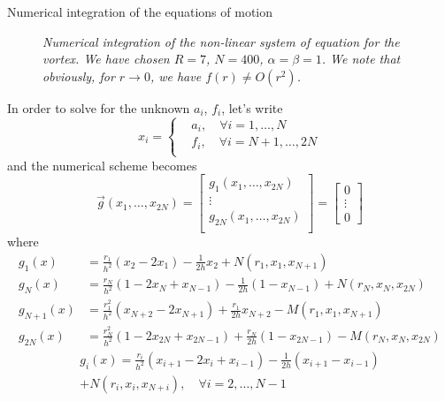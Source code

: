 \begin{subsection}{Numerical integration of the equations of motion}
  \begin{figure}[h!]
    
    \caption{\em Numerical integration of the non-linear system of
      equation for the vortex. We have chosen $R = 7$, $N = 400$,
      $\alpha = \beta = 1$. We note that obviously, for $r\to 0$, we
      have $f(r)\neq O(r^2)$.}
    \label{fig:a_and_f_funcs}
  \end{figure}

  In order to solve for the unknown $a_i$, $f_i$, let's write
  \begin{equation}
    x_i =\left\{
    \begin{aligned}
      &a_i,\quad\forall i = 1,\dots,N\\
      &f_i,\quad\forall i = N+1,\dots,2N\\
    \end{aligned}\right.
  \end{equation}
  and the numerical scheme becomes
  \begin{equation}
    \vec g(x_1,\dots,x_{2N}) =
    \begin{bmatrix}
      g_1(x_1, \dots, x_{2N})\\
      \vdots\\
      g_{2N}(x_1, \dots, x_{2N})\\
    \end{bmatrix}
    =
    \begin{bmatrix}
      0\\
      \vdots\\
      0
    \end{bmatrix}
  \end{equation}
  where
  \begin{align}
    g_1(x) &= \frac{r_1}{h^2}\left(x_2-2x_1\right)-\frac{1}{2h}x_2+N(r_1,x_1,x_{N+1})\\
    g_N(x) &= \frac{r_N}{h^2}\left(1-2x_N+x_{N-1}\right)-\frac{1}{2h}\left(1-x_{N-1}\right)+N(r_N,x_N,x_{2N})\\
    g_{N+1}(x)& = \frac{r_1^2}{h^2}\left(x_{N+2}-2x_{N+1}\right)+\frac{r_1}{2h}x_{N+2}-M(r_1,x_1, x_{N+1})\\
    g_{2N}(x) &= \frac{r_N^2}{h^2}\left(1-2x_{2N}+x_{2N-1}\right)+\frac{r_N}{2h}\left(1-x_{2N-1}\right)-M(r_N,x_N, x_{2N})
  \end{align}
  \begin{multline}
    g_i(x) = \frac{r_i}{h^2}\left(x_{i+1}-2x_i+x_{i-1}\right)-\frac{1}{2h}\left(x_{i+1}-x_{i-1}\right)\\
    +N(r_i, x_i, x_{N+i}),\quad
    \forall i = 2,\dots,N-1\\

\end{multline}
\end{subsection}

